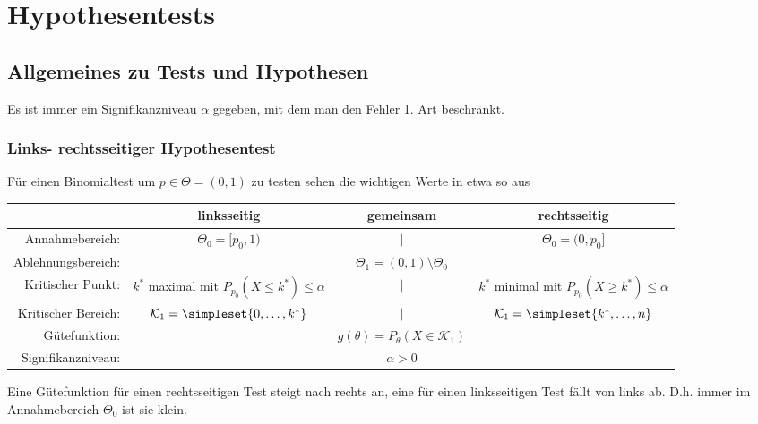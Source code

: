\chapter{Hypothesentests}
\section{Allgemeines zu Tests und Hypothesen}
Es ist immer ein Signifikanzniveau $\alpha$ gegeben, mit dem man den Fehler 1. Art beschränkt.

\subsection{Links- rechtsseitiger Hypothesentest}
Für einen Binomialtest um $p\in\Theta=(0,1)$ zu testen sehen die wichtigen Werte in etwa so aus
\begin{center}
	\begin{tabular}{r|ccc}
		&linksseitig&gemeinsam&rechtsseitig\\\hline
		Annahmebereich:&$\Theta_0=[p_0,1)$&$\Big|$&$\Theta_0=(0,p_0]$\\
		Ablehnungsbereich:&&$\Theta_1=(0,1)\setminus\Theta_0$&\\
		Kritischer Punkt:&\makecell{$k^\ast$ maximal mit\\ $P_{p_0}(X\leq k^\ast)\leq\alpha$}&$\Bigg|$&\makecell{$k^\ast$ minimal mit\\ $P_{p_0}(X\geq k^\ast)\leq\alpha$}\\
		Kritischer Bereich:&$\mathcal K_1=\simpleset{0,\ldots,k^\ast}$&$\Big|$&$\mathcal K_1=\simpleset{k^\ast,\ldots,n}$\\
		Gütefunktion:&&$g(\theta)=P_\theta(X\in\mathcal K_1)$&\\
		Signifikanzniveau:&&$\alpha>0$&
	\end{tabular}
\end{center}

Eine Gütefunktion für einen rechtsseitigen Test steigt nach rechts an, eine für einen linksseitigen Test fällt von links ab. D.h. immer im Annahmebereich $\Theta_0$ ist sie klein.

